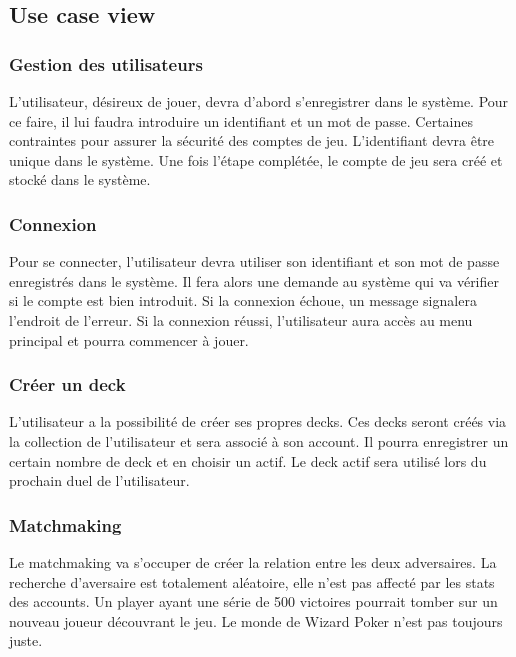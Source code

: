 \subsection{Use case view}
\subsubsection{Gestion des utilisateurs}
{\noindent L'utilisateur, désireux de jouer, devra d'abord s'enregistrer dans le système. Pour ce faire, il lui faudra introduire un identifiant et un mot de passe. Certaines contraintes pour assurer la sécurité des comptes de jeu. L'identifiant devra être unique dans le système. Une fois l'étape complétée, le compte de jeu sera créé et stocké dans le système.}
\subsubsection{Connexion}
{\noindent Pour se connecter, l'utilisateur devra utiliser son identifiant et son mot de passe enregistrés dans le système. Il fera alors une demande au système qui va vérifier si le compte est bien introduit. Si la connexion échoue, un message signalera l'endroit de l'erreur. Si la connexion réussi, l'utilisateur aura accès au menu principal et pourra commencer à jouer.
}

\subsubsection{Créer un deck}
{\noindent L'utilisateur a la possibilité de créer ses propres decks. Ces decks seront créés via la collection de l'utilisateur et sera associé à son account. Il pourra enregistrer un certain nombre de deck et en choisir un actif. Le deck actif sera utilisé lors du prochain duel de l'utilisateur.
}

\subsubsection{Matchmaking}
{\noindent Le matchmaking va s'occuper de créer la relation entre les deux adversaires. La recherche d'aversaire est totalement aléatoire, elle n'est pas affecté par les stats des accounts. Un player ayant une série de 500 victoires pourrait tomber sur un nouveau joueur découvrant le jeu. Le monde de Wizard Poker n'est pas toujours juste.
}

